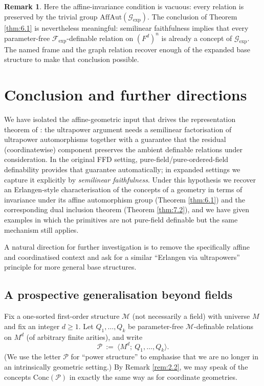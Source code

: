 \documentclass[11pt,a4paper]{article}
\newcommand{\G}{\mathcal{G}}
\newcommand{\F}{\mathcal{F}}
\renewcommand{\P}{\mathcal{P}}
\newcommand{\M}{\mathcal{M}}
\theoremstyle{definition}
\newtheorem{remark}[theorem]{Remark}
\begin{document}
\begin{remark}
	\label{rem:8.7}
Here the affine-invariance condition is vacuous:
every relation is preserved by the trivial group
$\mathrm{AffAut}(\G_{\exp})$. The conclusion of Theorem \ref{thm:6.1} is
nevertheless meaningful: semilinear faithfulness implies that every
parameter-free $\F_{\exp}$-definable relation on $(F^d)^n$
is already a concept of $\G_{\exp}$. The named frame and the graph
relation recover enough of the expanded base structure to make that
conclusion possible.
\end{remark}


\section{Conclusion and further directions}
\label{sec:9}


We have isolated the affine-geometric input that drives the
representation theorem of \cite{MSS26}: the ultrapower argument
needs a semilinear factorisation of ultrapower automorphisms together
with a guarantee that the residual (coordinatewise) component preserves
the ambient definable relations under consideration. In the original FFD
setting, pure-field/pure-ordered-field definability provides that
guarantee automatically; in expanded settings we capture it explicitly
by \emph{semilinear faithfulness}. Under this hypothesis we recover an
Erlangen-style characterisation of the concepts of a geometry in terms
of invariance under its affine automorphism group (Theorem \ref{thm:6.1}) and the
corresponding dual inclusion theorem (Theorem \ref{thm:7.2}), and we have given
examples in which the primitives are not pure-field definable but the
same mechanism still applies.

A natural direction for further investigation is to remove the
specifically affine and coordinatised context and ask for a similar
``Erlangen via ultrapowers'' principle for more general base structures.

\subsection{A prospective generalisation beyond fields}
\label{sec:9.1}

Fix a one-sorted first-order structure $\M$ (not necessarily a field)
with universe $M$ and fix an integer $d\ge 1$. Let $Q_1,\dots,Q_k$
be parameter-free $\M$-definable relations on $M^d$ (of
arbitrary finite arities), and write \[
\P\ :=\ \langle M^d;\ Q_1,\dots,Q_k\rangle .
\] (We use the letter $\P$ for ``power structure'' to emphasise that we
are no longer in an intrinsically geometric setting.) By Remark \ref{rem:2.2}, we
may speak of the concepts $\mathrm{Conc}(\P)$ in exactly the same way
as for coordinate geometries.
\end{document}
